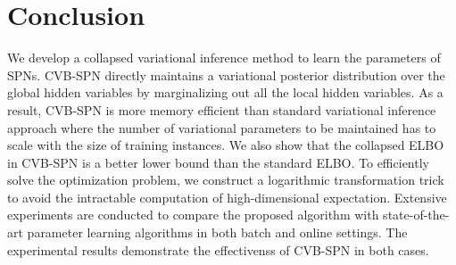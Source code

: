 \documentclass{article} %
\theoremstyle{definition}
\begin{document}
\section{Conclusion}
We develop a collapsed variational inference method to learn the parameters of SPNs. CVB-SPN directly maintains a variational posterior distribution over the global hidden variables by marginalizing out all the local hidden variables. As a result, CVB-SPN is more memory efficient than standard variational inference approach where the number of variational parameters to be maintained has to scale with the size of training instances. We also show that the collapsed ELBO in CVB-SPN is a better lower bound than the standard ELBO. To efficiently solve the optimization problem, we construct a logarithmic transformation trick to avoid the intractable computation of high-dimensional expectation. Extensive experiments are conducted to compare the proposed algorithm with state-of-the-art parameter learning algorithms in both batch and online settings. The experimental results demonstrate the effectivenss of CVB-SPN in both cases.
\newpage


\end{document}
